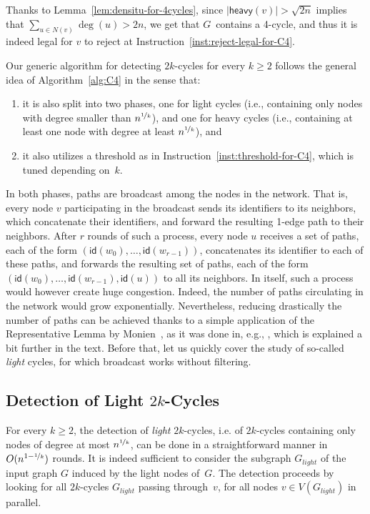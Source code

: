 \documentclass{article}
\newcommand{\id}{\mathsf{id}}
\begin{document}
Thanks to Lemma~\ref{lem:densitu-for-4cycles}, since $|\mathsf{heavy}(v)|> \sqrt{2n}$ implies that $\sum_{u\in N(v)}\deg (u)>2n$, we get that $G$~contains a 4-cycle, and thus it is indeed legal for $v$ to reject at Instruction~\ref{inst:reject-legal-for-C4}.

Our generic algorithm for detecting $2k$-cycles for every $k\geq 2$ follows the general idea of Algorithm~\ref{alg:C4} in the sense that:
\begin{enumerate}
    \item it is also split into two phases, one for light cycles (i.e., containing only nodes with degree smaller than $n^{\nicefrac{1}{k}}$), and one for heavy cycles (i.e., containing at least one node with degree at least $n^{\nicefrac{1}{k}}$), and
    \item it also utilizes a threshold as in Instruction~\ref{inst:threshold-for-C4}, which is tuned depending on~$k$. 
\end{enumerate}
In both phases, paths are broadcast among the nodes in the network. That is, every node $v$ participating in the broadcast sends its identifiers to its neighbors, which concatenate their identifiers, and forward the resulting 1-edge path to their neighbors. After $r$ rounds of such a process, every node $u$ receives a set of paths, each of the form $(\id(w_0),\dots,\id(w_{r-1}))$, concatenates its identifier to each of these paths, and forwards the resulting set of paths, each of the form $(\id(w_0),\dots,\id(w_{r-1}),\id(u))$ to all its neighbors. In itself, such a process would however create huge congestion. Indeed, the number of paths circulating in the network would grow exponentially. Nevertheless, reducing drastically the number of paths can  be achieved thanks to a simple application of the Representative Lemma by Monien~\cite{monien85}, as it was done in, e.g., \cite{FraigniaudO19,KorhonenR17}, which is explained a bit further in the text. Before that, let us quickly cover the study of so-called \emph{light} cycles, for which broadcast works without filtering. 

\subsection{Detection of Light $2k$-Cycles} 
\label{subsubsec:detection-light-cycles}

For every $k\geq 2$, the detection of \emph{light} $2k$-cycles, i.e. of $2k$-cycles containing only nodes of degree at most $n^{\nicefrac{1}{k}}$, can be done in a straightforward manner in $O(n^{1-\nicefrac{1}{k}})$ rounds. It is indeed sufficient to consider the subgraph $G_{light}$ of the input graph $G$ induced by the light nodes of~$G$. The detection proceeds by looking for all $2k$-cycles $G_{light}$ passing through~$v$, for all nodes $v\in V(G_{light})$ in parallel. 
\end{document}
